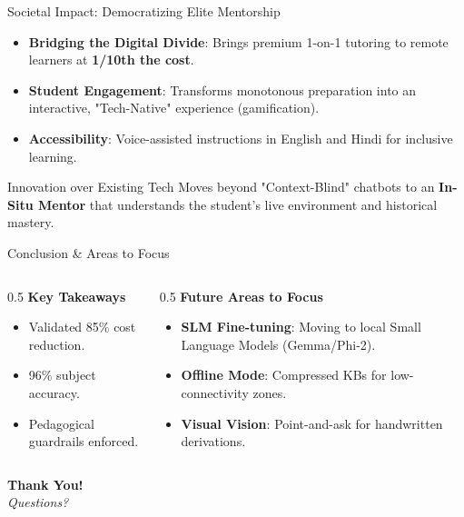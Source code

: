 \documentclass[aspectratio=169]{beamer}
\begin{document}
\begin{frame}{Societal Impact: Democratizing Elite Mentorship}
    \begin{itemize}
        \item \textbf{Bridging the Digital Divide}: Brings premium 1-on-1 tutoring to remote learners at \textbf{1/10th the cost}.
        \item \textbf{Student Engagement}: Transforms monotonous preparation into an interactive, "Tech-Native" experience (gamification).
        \item \textbf{Accessibility}: Voice-assisted instructions in English and Hindi for inclusive learning.
    \end{itemize}
    \begin{block}{Innovation over Existing Tech}
        Moves beyond "Context-Blind" chatbots to an \textbf{In-Situ Mentor} that understands the student's live environment and historical mastery.
    \end{block}
\end{frame}

\begin{frame}{Conclusion \& Areas to Focus}
    \begin{columns}
        \begin{column}{0.5\textwidth}
            \textbf{Key Takeaways}
            \begin{itemize}
                \item Validated 85\% cost reduction.
                \item 96\% subject accuracy.
                \item Pedagogical guardrails enforced.
            \end{itemize}
        \end{column}
        \begin{column}{0.5\textwidth}
            \textbf{Future Areas to Focus}
            \begin{itemize}
                \item \textbf{SLM Fine-tuning}: Moving to local Small Language Models (Gemma/Phi-2).
                \item \textbf{Offline Mode}: Compressed KBs for low-connectivity zones.
                \item \textbf{Visual Vision}: Point-and-ask for handwritten derivations.
            \end{itemize}
        \end{column}
    \end{columns}
    \vspace{0.4cm}
    \centering
    {\Large \textbf{Thank You!}} \\
    \textit{Questions?}
\end{frame}
\end{document}

